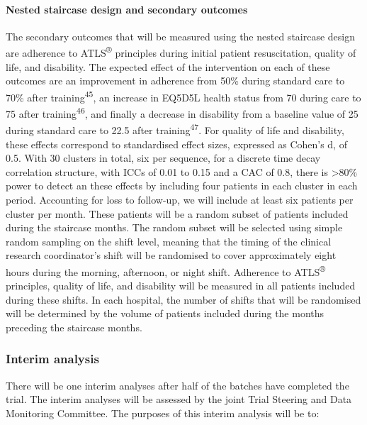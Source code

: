 \documentclass[
]{scrartcl}
\let\oldparagraph\paragraph
\renewcommand{\paragraph}[1]{\oldparagraph{#1}\mbox{}}
\begin{document}
\hypertarget{nested-staircase-design-and-secondary-outcomes}{%
\paragraph{Nested staircase design and secondary
outcomes}\label{nested-staircase-design-and-secondary-outcomes}}

The secondary outcomes that will be measured using the nested staircase
design are adherence to ATLS\textsuperscript{®} principles during
initial patient resuscitation, quality of life, and disability. The
expected effect of the intervention on each of these outcomes are an
improvement in adherence from 50\% during standard care to 70\% after
training\textsuperscript{45}, an increase in EQ5D5L health status from
70 during care to 75 after training\textsuperscript{46}, and finally a
decrease in disability from a baseline value of 25 during standard care
to 22.5 after training\textsuperscript{47}. For quality of life and
disability, these effects correspond to standardised effect sizes,
expressed as Cohen's d, of 0.5. With 30 clusters in total, six per
sequence, for a discrete time decay correlation structure, with ICCs of
0.01 to 0.15 and a CAC of 0.8, there is \textgreater80\% power to detect
an these effects by including four patients in each cluster in each
period. Accounting for loss to follow-up, we will include at least six
patients per cluster per month. These patients will be a random subset
of patients included during the staircase months. The random subset will
be selected using simple random sampling on the shift level, meaning
that the timing of the clinical research coordinator's shift will be
randomised to cover approximately eight hours during the morning,
afternoon, or night shift. Adherence to ATLS\textsuperscript{®}
principles, quality of life, and disability will be measured in all
patients included during these shifts. In each hospital, the number of
shifts that will be randomised will be determined by the volume of
patients included during the months preceding the staircase months.

\hypertarget{interim-analysis}{%
\subsubsection{Interim analysis}\label{interim-analysis}}

There will be one interim analyses after half of the batches have
completed the trial. The interim analyses will be assessed by the joint
Trial Steering and Data Monitoring Committee. The purposes of this
interim analysis will be to:
\end{document}
